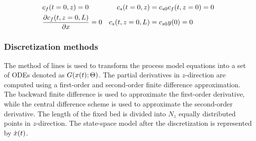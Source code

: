 \documentclass[../Article_Model_Parameters.tex]{subfiles}
\begin{document}
			{\footnotesize
				\begin{align*}
					&{\color{black}c_f}(t = 0, z) = 0 & {\color{black}c_s}(t = 0, z) = {\color{black}c_{s0}} &{c_f}(t, z=0) = 0 \\
					&\frac{\partial c_f(t,z=0,L)}{\partial x} = 0 & c_s(t, z=0,L) = {\color{black}c_{s0}} &y(0) = 0
			\end{align*} }
			
		\subsubsection{Discretization methods}
		
		The method of lines is used to transform the process model equations into a set of ODEs denoted as ${\color{black}G}({\color{black}x}(t);{\color{black}\Theta})$. The partial derivatives in $z$-direction are computed using a first-order and second-order finite difference approximation. The backward finite difference is used to approximate the first-order derivative, while the central difference scheme is used to approximate the second-order derivative. The length of the fixed bed is divided into $N_z$ equally distributed points in $z$-direction. The state-space model after the discretization is represented by $\dot{{\color{black}x}}(t)$.
		
\end{document}

